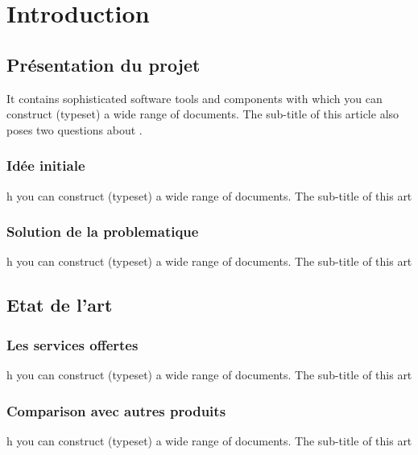 {

\pagestyle{fancy}

\pagestyle{fancy}
\fancyhead{}


\hypersetup{linkcolor=black}


\tableofcontents\thispagestyle{fancy}
\listoffigures
\listoftables

\pagebreak
{}
\chapter{Introduction}\thispagestyle{fancy}


\section{Présentation du projet}
It contains sophisticated software tools and components with which you can construct (typeset) a wide range of documents. The sub-title of this article also poses two questions about .

\subsection{Idée initiale}
h you can construct (typeset) a wide range of documents. The sub-title of this art

\subsection{Solution de la problematique}
h you can construct (typeset) a wide range of documents. The sub-title of this art


\section{Etat de l'art}

\subsection{Les services offertes}
h you can construct (typeset) a wide range of documents. The sub-title of this art

\subsection{Comparison avec autres produits}
h you can construct (typeset) a wide range of documents. The sub-title of this art



}
